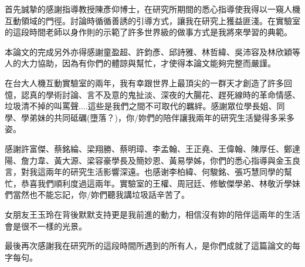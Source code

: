 \begin{acknowledgementszh}
首先誠摯的感謝指導教授陳彥仰博士，在研究所期間的悉心指導使我得以一窺人機互動領域的門徑。討論時循循善誘的引導方式，讓我在研究上獲益匪淺。在實驗室的這段時間老師以身作則的示範了許多世界級的做事方式是我將來學習的典範。

本論文的完成另外亦得感謝童盈超、許鈞彥、邱詩雅、林哲緯、吳沛容及林欣穎等人的大力協助，因為有你們的體諒與幫忙，才使得本論文能夠完整而嚴謹。

在台大人機互動實驗室的兩年，我有幸跟世界上最頂尖的一群天才創造了許多回憶，認真的學術討論、言不及意的鬼扯淡、深夜的大腸花、趕死線時的革命情感、垃圾清不掉的叫罵聲....這些是我們之間不可取代的羈絆。感謝眾位學長姐、同學、學弟妹的共同砥礪(墮落？)，你/妳們的陪伴讓我兩年的研究生活變得多采多姿。

感謝許富傑、蔡銘綸、梁翔勝、蔡明璋、李孟翰、王正堯、王偉翰、陳厚任、鄭達陽、詹力韋、黃大源、梁容豪學長及簡妙恩、黃易學姊，你們的悉心指導與金玉良言，對我這兩年的研究生活影響深遠。也感谢李柏緯、何駿銘、張巧慧同學的幫忙，恭喜我們順利度過這兩年。實驗室的王權、周冠廷、修敏傑學弟、林敬沂學妹們當然也不能忘記，你/妳們聽我講垃圾話辛苦了。


女朋友王玉玲在背後默默支持更是我前進的動力，相信沒有妳的陪伴這兩年的生活會是很不一樣的光景。

最後再次感謝我在研究所的這段時間所遇到的所有人，是你們成就了這篇論文的每字每句。


\end{acknowledgementszh}

